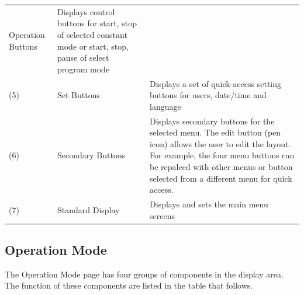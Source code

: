 \begin{longtable}[]{@{}lll@{}}
\begin{minipage}[t]{0.23\columnwidth}
Operation Buttons\strut
\end{minipage} & \begin{minipage}[t]{0.62\columnwidth}\raggedright
Displays control buttons for start, stop of selected constant mode or
start, stop, pause of select program mode\strut
\end{minipage}\tabularnewline
\begin{minipage}[t]{0.06\columnwidth}\raggedright
(5)\strut
\end{minipage} & \begin{minipage}[t]{0.23\columnwidth}\raggedright
Set Buttons\strut
\end{minipage} & \begin{minipage}[t]{0.62\columnwidth}\raggedright
Displays a set of quick-access setting buttons for users, date/time and
language\strut
\end{minipage}\tabularnewline
\begin{minipage}[t]{0.06\columnwidth}\raggedright
(6)\strut
\end{minipage} & \begin{minipage}[t]{0.23\columnwidth}\raggedright
Secondary Buttons\strut
\end{minipage} & \begin{minipage}[t]{0.62\columnwidth}\raggedright
Displays secondary buttons for the selected menu. The edit button (pen
icon) allows the user to edit the layout. For example, the four menu
buttons can be repalced with other menus or button selected from a
different menu for quick access.\strut
\end{minipage}\tabularnewline
\begin{minipage}[t]{0.06\columnwidth}\raggedright
(7)\strut
\end{minipage} & \begin{minipage}[t]{0.23\columnwidth}\raggedright
Standard Display\strut
\end{minipage} & \begin{minipage}[t]{0.62\columnwidth}\raggedright
Displays and sets the main menu screens\strut
\end{minipage}\tabularnewline
\bottomrule
\end{longtable}


\subsection{Operation Mode}

The Operation Mode page has four groups of components in the display
area. The function of these components are listed in the table that
follows.


